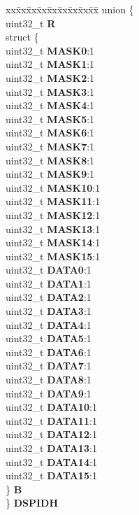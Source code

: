 \begin{DoxyCompactItemize}
\begin{tabbing}
\end{tabbing}\item 
\mbox{\label{structSIU__tag_ab37b066d6d519dda4542356155758ef2}} 
\begin{tabbing}
xx\=xx\=xx\=xx\=xx\=xx\=xx\=xx\=xx\=\kill
union \{\\
\>uint32\_t {\bfseries R}\\
\>struct \{\\
\>\>uint32\_t {\bfseries MASK0}:1\\
\>\>uint32\_t {\bfseries MASK1}:1\\
\>\>uint32\_t {\bfseries MASK2}:1\\
\>\>uint32\_t {\bfseries MASK3}:1\\
\>\>uint32\_t {\bfseries MASK4}:1\\
\>\>uint32\_t {\bfseries MASK5}:1\\
\>\>uint32\_t {\bfseries MASK6}:1\\
\>\>uint32\_t {\bfseries MASK7}:1\\
\>\>uint32\_t {\bfseries MASK8}:1\\
\>\>uint32\_t {\bfseries MASK9}:1\\
\>\>uint32\_t {\bfseries MASK10}:1\\
\>\>uint32\_t {\bfseries MASK11}:1\\
\>\>uint32\_t {\bfseries MASK12}:1\\
\>\>uint32\_t {\bfseries MASK13}:1\\
\>\>uint32\_t {\bfseries MASK14}:1\\
\>\>uint32\_t {\bfseries MASK15}:1\\
\>\>uint32\_t {\bfseries DATA0}:1\\
\>\>uint32\_t {\bfseries DATA1}:1\\
\>\>uint32\_t {\bfseries DATA2}:1\\
\>\>uint32\_t {\bfseries DATA3}:1\\
\>\>uint32\_t {\bfseries DATA4}:1\\
\>\>uint32\_t {\bfseries DATA5}:1\\
\>\>uint32\_t {\bfseries DATA6}:1\\
\>\>uint32\_t {\bfseries DATA7}:1\\
\>\>uint32\_t {\bfseries DATA8}:1\\
\>\>uint32\_t {\bfseries DATA9}:1\\
\>\>uint32\_t {\bfseries DATA10}:1\\
\>\>uint32\_t {\bfseries DATA11}:1\\
\>\>uint32\_t {\bfseries DATA12}:1\\
\>\>uint32\_t {\bfseries DATA13}:1\\
\>\>uint32\_t {\bfseries DATA14}:1\\
\>\>uint32\_t {\bfseries DATA15}:1\\
\>\} {\bfseries B}\\
\} {\bfseries DSPIDH}\\


\end{tabbing}
\end{DoxyCompactItemize}
